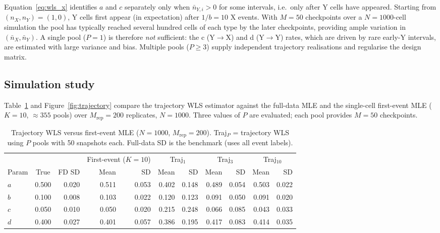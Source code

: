 \documentclass[12pt]{article}
\begin{document}
Equation~\eqref{eq:wls_x} identifies $a$ and $c$ separately only when
$\bar{n}_{Y,i} > 0$ for some intervals, i.e.\ only after Y cells have
appeared.  Starting from $(n_X,n_Y)=(1,0)$, Y cells first appear (in
expectation) after $1/b = 10$ X events.  With $M = 50$ checkpoints over a
$N = 1000$-cell simulation the pool has typically reached several hundred
cells of each type by the later checkpoints, providing ample variation in
$(\bar{n}_X,\bar{n}_Y)$.  A single pool ($P=1$) is therefore \emph{not}
sufficient: the c (Y$\to$X) and d (Y$\to$Y) rates, which are driven by rare
early-Y intervals, are estimated with large variance and bias.  Multiple
pools ($P \ge 3$) supply independent trajectory realisations and regularise
the design matrix.

\subsection{Simulation study}

Table~\ref{tab:trajectory} and Figure~\ref{fig:trajectory} compare the
trajectory WLS estimator against the full-data MLE and the single-cell
first-event MLE ($K=10$, $\approx355$ pools) over $M_{\mathrm{rep}}=200$
replicates, $N=1000$.  Three values of $P$ are evaluated; each pool provides
$M=50$ checkpoints.

\begin{table}[H]
\centering
\caption{Trajectory WLS versus first-event MLE ($N=1000$, $M_{\mathrm{rep}}=200$).
         Traj$_P$ = trajectory WLS using $P$ pools with 50 snapshots each.
         Full-data SD is the benchmark (uses all event labels).}
\label{tab:trajectory}
\begin{tabular}{lcrrrrrrrrr}
\toprule
 & & & \multicolumn{2}{c}{First-event ($K\!=\!10$)} &
       \multicolumn{2}{c}{Traj$_1$} &
       \multicolumn{2}{c}{Traj$_3$} &
       \multicolumn{2}{c}{Traj$_{10}$} \\
\cmidrule(lr){4-5}\cmidrule(lr){6-7}\cmidrule(lr){8-9}\cmidrule(lr){10-11}
Param & True & FD SD & Mean & SD & Mean & SD & Mean & SD & Mean & SD \\
\midrule
$a$ & 0.500 & 0.020 & 0.511 & 0.053 & 0.402 & 0.148 & 0.489 & 0.054 & 0.503 & 0.022 \\
$b$ & 0.100 & 0.008 & 0.103 & 0.022 & 0.120 & 0.123 & 0.091 & 0.050 & 0.091 & 0.020 \\
$c$ & 0.050 & 0.010 & 0.050 & 0.020 & 0.215 & 0.248 & 0.066 & 0.085 & 0.043 & 0.033 \\
$d$ & 0.400 & 0.027 & 0.401 & 0.057 & 0.386 & 0.195 & 0.417 & 0.083 & 0.414 & 0.035 \\
\bottomrule
\end{tabular}
\end{table}
\end{document}
